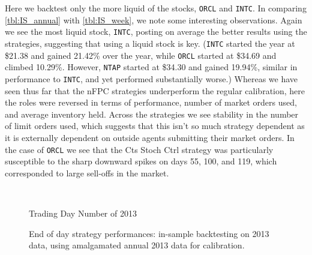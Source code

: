 Here we backtest only the more liquid of the stocks, \texttt{ORCL} and \texttt{INTC}. In comparing \autoref{tbl:IS_annual} with \autoref{tbl:IS_week}, we note some interesting observations. Again we see the most liquid stock, \texttt{INTC}, posting on average the better results using the strategies, suggesting that using a liquid stock is key.  (\texttt{INTC} started the year at \$21.38 and gained 21.42\% over the year, while \texttt{ORCL} started at \$34.69 and climbed 10.29\%. However, \texttt{NTAP} started at \$34.30 and gained 19.94\%, similar in performance to \texttt{INTC}, and yet performed substantially worse.) Whereas we have seen thus far that the nFPC strategies underperform the regular calibration, here the roles were reversed in terms of performance, number of market orders used, and average inventory held. Across the strategies we see stability in the number of limit orders used, which suggests that this isn't so much strategy dependent as it is externally dependent on outside agents submitting their market orders. In the case of \texttt{ORCL} we see that the Cts Stoch Ctrl strategy was particularly susceptible to the sharp downward spikes on days 55, 100, and 119, which corresponded to large sell-offs in the market. 


\begin{figure}
\centering
\begin{subfigure}{.45\linewidth}
  \centering
  \setlength\figureheight{\linewidth} 
  \setlength\figurewidth{\linewidth}
  
\end{subfigure}%
\hfill%
\begin{subfigure}{.45\linewidth}
  \centering
  \setlength\figureheight{\linewidth} 
  \setlength\figurewidth{\linewidth}
   
\end{subfigure}\\

\leavevmode{}\hspace{0pt plus 1filll}\null

Trading Day Number of 2013

\vspace{1cm}
\begin{subfigure}{\linewidth}
  \setlength\figureheight{\linewidth} 
  \setlength\figurewidth{\linewidth}
  \resizebox{\linewidth}{!}{}
\end{subfigure}%
  \caption[In-sample backtesting performance using annual calibration]{End of day strategy performances: in-sample backtesting on 2013 data, using amalgamated annual 2013 data for calibration.}
  \label{fig:IS_annual_comp}
\end{figure}

